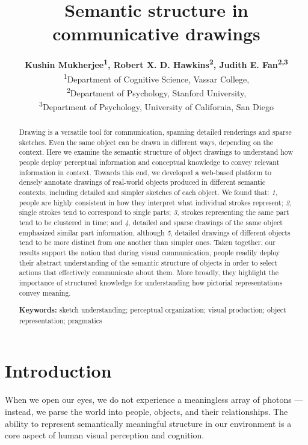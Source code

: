 \documentclass[10pt,letterpaper]{article}
\title{Semantic structure in communicative drawings}
\author{{\large \bf Kushin Mukherjee\textsuperscript{1}, Robert X. D. Hawkins\textsuperscript{2}, Judith E. Fan\textsuperscript{2,3}} \\
\textsuperscript{1}Department of Cognitive Science, Vassar College, \\
\textsuperscript{2}Department of Psychology, Stanford University, \\
\textsuperscript{3}Department of Psychology, University of California, San Diego}
\begin{document}
\maketitle 

\begin{abstract}
Drawing is a versatile tool for communication, spanning detailed renderings and sparse sketches. 
Even the same object can be drawn in different ways, depending on the context. 
Here we examine the semantic structure of object drawings to understand how people deploy perceptual information and conceptual knowledge to convey relevant information in context.
Towards this end, we developed a web-based platform to densely annotate drawings of real-world objects produced in different semantic contexts, including detailed and simpler sketches of each object. 
We found that: \textit{1}, people are highly consistent in how they interpret what individual strokes represent; \textit{2}, single strokes tend to correspond to single parts; \textit{3}, strokes representing the same part tend to be clustered in time; and \textit{4}, detailed and sparse drawings of the same object emphasized similar part information, although \textit{5}, detailed drawings of different objects tend to be more distinct from one another than simpler ones. 
Taken together, our results support the notion that during visual communication, people readily deploy their abstract understanding of the semantic structure of objects in order to select actions that effectively communicate about them. 
More broadly, they highlight the importance of structured knowledge for understanding how pictorial representations convey meaning. 

\textbf{Keywords:} 
sketch understanding; perceptual organization; visual production; object representation; pragmatics
\end{abstract}

\section{Introduction}

When we open our eyes, we do not experience a meaningless array of photons --- instead, we parse the world into people, objects, and their relationships. 
The ability to represent semantically meaningful structure in our environment is a core aspect of human visual perception and cognition. 
\end{document}
